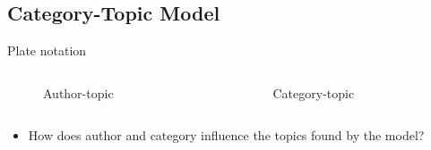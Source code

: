 \subsection{Category-Topic Model}
\begin{frame}{\insertsubsection}{Plate notation}
	\begin{columns}
		\begin{column}{0.45\textwidth}
			\begin{figure}
				\resizebox{\textwidth}{!}{%
					
				}
				\caption*{Author-topic}
			\end{figure}
		\end{column}
		\begin{column}{0.45\textwidth}
			\begin{figure}
				\resizebox{\textwidth}{!}{%
					
				}
				\caption*{Category-topic}
			\end{figure}
		\end{column}
	\end{columns}
\end{frame}

\begin{frame}{\insertsection}{}
	\begin{itemize}
		\item How does author and category influence the topics found by the model?
	\end{itemize}
\end{frame}
